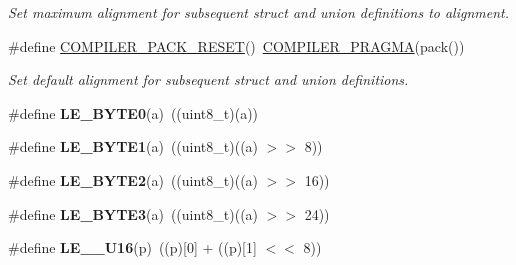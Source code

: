 \begin{DoxyCompactItemize}
\begin{DoxyCompactList}\small\item\em Set maximum alignment for subsequent struct and union definitions to {\itshape alignment}. \end{DoxyCompactList}\item 
\mbox{\label{group__doc__driver__hal__utils__macro_ga38d28b622a4bc7b0f3fb2be2ef1e0086}} 
\#define \hyperlink{group__doc__driver__hal__utils__macro_ga38d28b622a4bc7b0f3fb2be2ef1e0086}{C\+O\+M\+P\+I\+L\+E\+R\+\_\+\+P\+A\+C\+K\+\_\+\+R\+E\+S\+ET}()~\hyperlink{group__doc__driver__hal__utils__macro_ga85a3ab5701281268521f109ed0078668}{C\+O\+M\+P\+I\+L\+E\+R\+\_\+\+P\+R\+A\+G\+MA}(pack())
\begin{DoxyCompactList}\small\item\em Set default alignment for subsequent struct and union definitions. \end{DoxyCompactList}\item 
\mbox{\label{group__doc__driver__hal__utils__macro_gaab4d1853098bbbfe4567d6cd7f2c099a}} 
\#define {\bfseries L\+E\+\_\+\+B\+Y\+T\+E0}(a)~((uint8\+\_\+t)(a))
\item 
\mbox{\label{group__doc__driver__hal__utils__macro_ga2c2cccafec8ecf0d26a8bdcf8f7748d3}} 
\#define {\bfseries L\+E\+\_\+\+B\+Y\+T\+E1}(a)~((uint8\+\_\+t)((a) $>$$>$ 8))
\item 
\mbox{\label{group__doc__driver__hal__utils__macro_gac21be76d243d97c095fe4ec85c94968c}} 
\#define {\bfseries L\+E\+\_\+\+B\+Y\+T\+E2}(a)~((uint8\+\_\+t)((a) $>$$>$ 16))
\item 
\mbox{\label{group__doc__driver__hal__utils__macro_ga3ef5f564d5325745d309b92ca5be0462}} 
\#define {\bfseries L\+E\+\_\+\+B\+Y\+T\+E3}(a)~((uint8\+\_\+t)((a) $>$$>$ 24))
\item 
\mbox{\label{group__doc__driver__hal__utils__macro_ga28c4c688462eddbe0385bdece51c5f33}} 
\#define {\bfseries L\+E\+\_\+\_\+\+U16}(p)~((p)\mbox{[}0\mbox{]} + ((p)\mbox{[}1\mbox{]} $<$$<$ 8))
\item 

\end{DoxyCompactItemize}
